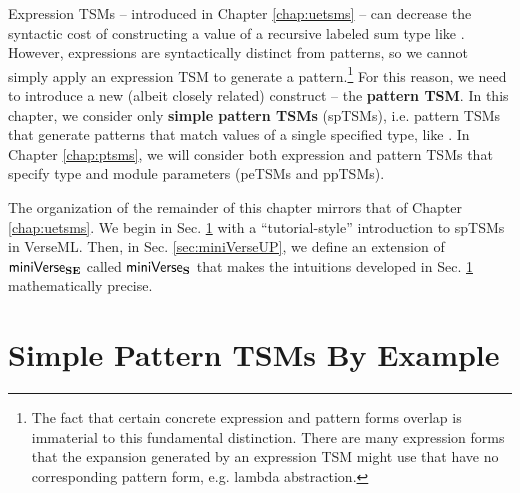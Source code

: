 Expression TSMs -- introduced in Chapter \ref{chap:uetsms} -- can decrease the syntactic cost of constructing a value of a  recursive labeled sum type like . However, expressions are syntactically distinct from patterns, so we cannot simply apply an expression TSM to generate a pattern.\footnote{The fact that certain concrete expression and pattern forms overlap is immaterial to this fundamental distinction. There are many expression forms that the expansion generated by an expression TSM might use that have no corresponding pattern form, e.g.  lambda abstraction.} %
For this reason, we need to introduce a new (albeit closely related) construct -- the \textbf{pattern TSM}. In this chapter, we consider only \textbf{simple pattern TSMs} (spTSMs), i.e. pattern TSMs that generate patterns that match values of a single specified type, like . In Chapter \ref{chap:ptsms}, we will consider both expression and pattern TSMs that specify type and module parameters (peTSMs and ppTSMs). 

The organization of the remainder of this chapter mirrors that of Chapter \ref{chap:uetsms}. We begin in Sec. \ref{sec:ptsms-by-example} with a ``tutorial-style'' introduction to spTSMs in VerseML. 
Then, in Sec. \ref{sec:miniVerseUP}, we define an extension of $\mathsf{miniVerse}_\textbf{SE}$ called $\mathsf{miniVerse}_\textbf{S}$ that makes the intuitions developed in Sec. \ref{sec:ptsms-by-example} mathematically precise.

\section{Simple Pattern TSMs By Example}\label{sec:ptsms-by-example}


